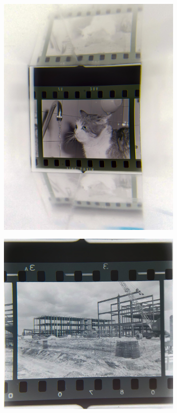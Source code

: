 \begin{figure}[H]
    \centering
    \begin{subfigure}{0.24\textwidth}
        \includegraphics[width=\linewidth]{Illustrations/P1.jpg}
        \caption{}
    \end{subfigure}
    \begin{subfigure}{0.24\textwidth}
        \includegraphics[width=\linewidth]{Illustrations/P2.jpg}

\end{subfigure}
\end{figure}

